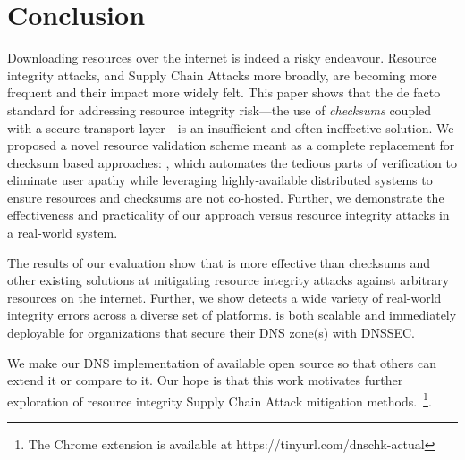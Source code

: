 \section{Conclusion} \label{sec:conclusion}

Downloading resources over the internet is indeed a risky endeavour. Resource
integrity attacks, and Supply Chain Attacks more broadly, are becoming more
frequent and their impact more widely felt. This paper shows that the de facto
standard for addressing resource integrity risk---the use of \emph{checksums}
coupled with a secure transport layer---is an insufficient and often ineffective
solution. We proposed a novel resource validation scheme meant as a complete
replacement for checksum based approaches: \SYSTEM{}, which automates the
tedious parts of verification to eliminate user apathy while leveraging
highly-available distributed systems to ensure resources and checksums are not
co-hosted. Further, we demonstrate the effectiveness and practicality of our
approach versus resource integrity attacks in a real-world system.

The results of our evaluation show that \SYSTEM{} is more effective than
checksums and other existing solutions at mitigating resource integrity attacks
against arbitrary resources on the internet. Further, we show \SYSTEM{} detects
a wide variety of real-world integrity errors across a diverse set of platforms.
\SYSTEM{} is both scalable and immediately deployable for organizations that
secure their DNS zone(s) with DNSSEC.

We make our DNS implementation of \SYSTEM{} available open source so that others
can extend it or compare to it. Our hope is that this work motivates further
exploration of resource integrity Supply Chain Attack mitigation
methods.~\footnote{The \SYSTEM{} Chrome extension is available at
https://tinyurl.com/dnschk-actual}.
